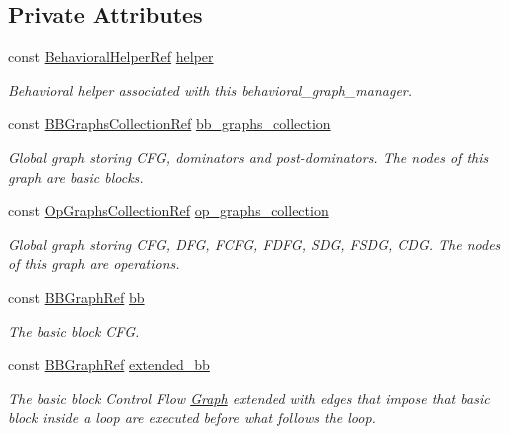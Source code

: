 \subsection*{Private Attributes}
\begin{DoxyCompactItemize}
\item 
const \hyperlink{behavioral__helper_8hpp_a9da8798985d185e76cbde965d9d68f84}{Behavioral\+Helper\+Ref} \hyperlink{classFunctionBehavior_a69d523d2586e3b825d2f5f68d7e99b0c}{helper}
\begin{DoxyCompactList}\small\item\em Behavioral helper associated with this behavioral\+\_\+graph\+\_\+manager. \end{DoxyCompactList}\item 
const \hyperlink{basic__block_8hpp_ab2c15dfa325570d7a3e0e364c2f5fdfa}{B\+B\+Graphs\+Collection\+Ref} \hyperlink{classFunctionBehavior_a10ddb15800e947c1da7edc2cbe19ad50}{bb\+\_\+graphs\+\_\+collection}
\begin{DoxyCompactList}\small\item\em Global graph storing C\+FG, dominators and post-\/dominators. The nodes of this graph are basic blocks. \end{DoxyCompactList}\item 
const \hyperlink{op__graph_8hpp_a6a9918dc96f448814ad35759f9460ed7}{Op\+Graphs\+Collection\+Ref} \hyperlink{classFunctionBehavior_a3329d013ce9b021cfca706f34b9986d7}{op\+\_\+graphs\+\_\+collection}
\begin{DoxyCompactList}\small\item\em Global graph storing C\+FG, D\+FG, F\+C\+FG, F\+D\+FG, S\+DG, F\+S\+DG, C\+DG. The nodes of this graph are operations. \end{DoxyCompactList}\item 
const \hyperlink{basic__block_8hpp_a0e7f233d1b83cad0bfd5aa865f0d3532}{B\+B\+Graph\+Ref} \hyperlink{classFunctionBehavior_abeeb56077e46d00dd8275a49a97bf0b4}{bb}
\begin{DoxyCompactList}\small\item\em The basic block C\+FG. \end{DoxyCompactList}\item 
const \hyperlink{basic__block_8hpp_a0e7f233d1b83cad0bfd5aa865f0d3532}{B\+B\+Graph\+Ref} \hyperlink{classFunctionBehavior_a5206698152a74e1dd8289fee701aab60}{extended\+\_\+bb}
\begin{DoxyCompactList}\small\item\em The basic block Control Flow \hyperlink{structGraph}{Graph} extended with edges that impose that basic block inside a loop are executed before what follows the loop. \end{DoxyCompactList}\item 

\end{DoxyCompactItemize}
